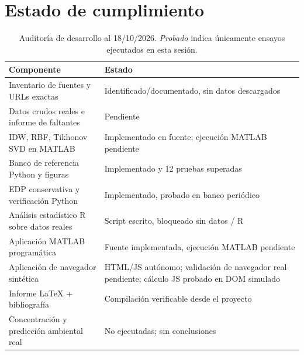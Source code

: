 \section{Estado de cumplimiento}\label{sec:estado}
\begin{table}[H]\centering\small\caption{Auditoría de desarrollo al 18/10/2026. \emph{Probado} indica únicamente ensayos ejecutados en esta sesión.}\label{tab:estado}
\begin{tabular}{p{.50\linewidth}p{.35\linewidth}}\toprule Componente & Estado \\\midrule
Inventario de fuentes y URLs exactas & Identificado/documentado, sin datos descargados \\
Datos crudos reales e informe de faltantes & Pendiente \\
IDW, RBF, Tikhonov SVD en MATLAB & Implementado en fuente; ejecución MATLAB pendiente \\
Banco de referencia Python y figuras & Implementado y 12 pruebas superadas \\
EDP conservativa y verificación Python & Implementado, probado en banco periódico \\
Análisis estadístico R sobre datos reales & Script escrito, bloqueado sin datos / R \\
Aplicación MATLAB programática & Fuente implementada, ejecución MATLAB pendiente \\
Aplicación de navegador sintética & HTML/JS autónomo; validación de navegador real pendiente; cálculo JS probado en DOM simulado \\
Informe LaTeX + bibliografía & Compilación verificable desde el proyecto \\
Concentración y predicción ambiental real & No ejecutadas; sin conclusiones \\\bottomrule\end{tabular}\end{table}

